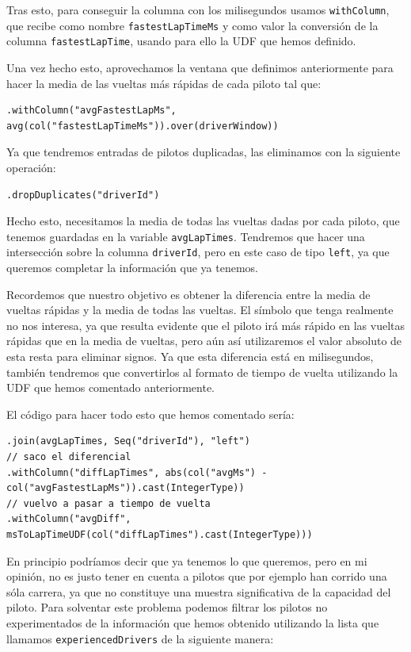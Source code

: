 \documentclass[12pt,twoside,titlepage]{report}
\begin{document}
Tras esto, para conseguir la columna con los milisegundos usamos \texttt{withColumn}, que recibe como nombre \texttt{fastestLapTimeMs} y como valor la conversión de la columna \texttt{fastestLapTime}, usando para ello la UDF que hemos definido.

Una vez hecho esto, aprovechamos la ventana que definimos anteriormente para hacer la media de las vueltas más rápidas de cada piloto tal que:

\begin{lstlisting}
.withColumn("avgFastestLapMs", avg(col("fastestLapTimeMs")).over(driverWindow))
\end{lstlisting}

Ya que tendremos entradas de pilotos duplicadas, las eliminamos con la siguiente operación:

\begin{lstlisting}
.dropDuplicates("driverId")
\end{lstlisting}

Hecho esto, necesitamos la media de todas las vueltas dadas por cada piloto, que tenemos guardadas en la variable \texttt{avgLapTimes}. Tendremos que hacer una intersección sobre la columna \texttt{driverId}, pero en este caso de tipo \texttt{left}, ya que queremos completar la información que ya tenemos.

Recordemos que nuestro objetivo es obtener la diferencia entre la media de vueltas rápidas y la media de todas las vueltas. El símbolo que tenga realmente no nos interesa, ya que resulta evidente que el piloto irá más rápido en las vueltas rápidas que en la media de vueltas, pero aún así utilizaremos el valor absoluto de esta resta para eliminar signos. Ya que esta diferencia está en milisegundos, también tendremos que convertirlos al formato de tiempo de vuelta utilizando la UDF que hemos comentado anteriormente.

El código para hacer todo esto que hemos comentado sería:

\begin{lstlisting}
.join(avgLapTimes, Seq("driverId"), "left")
// saco el diferencial
.withColumn("diffLapTimes", abs(col("avgMs") - col("avgFastestLapMs")).cast(IntegerType))
// vuelvo a pasar a tiempo de vuelta
.withColumn("avgDiff", msToLapTimeUDF(col("diffLapTimes").cast(IntegerType)))
\end{lstlisting}

En principio podríamos decir que ya tenemos lo que queremos, pero en mi opinión, no es justo tener en cuenta a pilotos que por ejemplo han corrido una sóla carrera, ya que no constituye una muestra significativa de la capacidad del piloto. Para solventar este problema podemos filtrar los pilotos no experimentados de la información que hemos obtenido utilizando la lista que llamamos \texttt{experiencedDrivers} de la siguiente manera:
\end{document}
